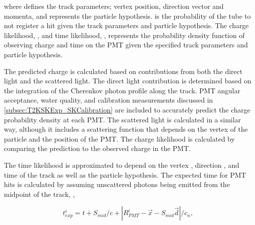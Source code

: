 where \quickmath{\vec{\theta}} defines the track parameters; vertex position, direction vector and momenta, and \quickmath{\Gamma} represents the particle hypothesis.  is the probability of the  tube to not register a hit given the track parameters and particle hypothesis. The charge likelihood, , and time likelihood, , represents the probability density function of observing charge  and time  on the  PMT given the specified track parameters and particle hypothesis.


The predicted charge is calculated based on contributions from both the direct light and the scattered light. The direct light contribution is determined based on the integration of the Cherenkov photon profile along the track. PMT angular acceptance, water quality, and calibration measurements discussed in \autoref{subsec:T2KSKExp_SKCalibration} are included to accurately predict the charge probability density at each PMT. The scattered light is calculated in a similar way, although it includes a scattering function that depends on the vertex of the particle and the position of the PMT. The charge likelihood is calculated by comparing the prediction to the observed charge in the PMT.

The time likelihood is approximated to depend on the vertex , direction , and time  of the track  as well as the particle hypothesis. The expected time for PMT hits is calculated by assuming unscattered photons being emitted from the midpoint of the track, ,

\begin{equation}
  t_{exp}^{i} = t + S_{mid}/c + |R_{PMT}^{i} - \vec{x} - S_{mid}\vec{d}|/c_{n},
\end{equation}

